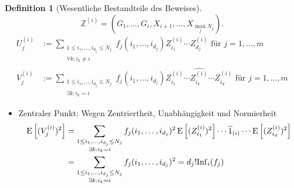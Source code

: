 \documentclass[11pt, ngerman]{scrartcl}
\theoremstyle{definition}
\newtheorem{definition}{Definition}
\theoremstyle{plain}
\newcommand{\E}[1][]{%
    \operatorname{E}%
    \ifx\\#1\\\else%
        \left[#1\right]%
    \fi%
}
\newcommand{\<}{\langle}
\renewcommand{\>}{\rangle}
\begin{document}
\begin{definition}[Wesentliche Bestandteile des Beweises]
  \[
        \mathbb{Z}^{(i)} = \left(G_1, \ldots, G_i, X_{i+1}, \ldots, X_{\max_j N_j}\right).\]
  \begin{align*}
        U_j^{(i)} &:= \sum_{\substack{1 \leq i_1, \ldots, i_{d_j} \leq N_j \\ \forall k: i_k \neq i}} f_j(i_1, \ldots, i_{d_j}) Z_{i_1}^{(i)} \cdots Z_{d_j}^{(i)} \text{ für } j = 1, \ldots, m\\
        V_j^{(i)} &:= \sum_{\substack{1 \leq i_1, \ldots, i_{d_j} \leq N_j \\ \exists k: i_k = i}} f_j(i_1, \ldots, i_{d_j}) Z_{i_1}^{(i)} \cdots \widehat{Z_{i_{k}}^{(i)}} \cdots Z_{i_d}^{(i)} \text{ für } j = 1, \ldots, m
    \end{align*}
\end{definition}
\begin{itemize}
  \item Zentraler Punkt: Wegen Zentriertheit, Unabhängigkeit und Normierheit \begin{align*}\E[(V_j^{(i)})^2] &= \sum_{\substack{1 \leq i_1, \ldots, i_{d_j} \leq N_j \\ \exists k: i_k = i}} f_j(i_1, \ldots, i_{d_j})^2 \E[(Z_{i_1}^{(i)})^2] \cdots \widehat{1}_{(i)} \cdots \E[(Z_{i_d}^{(i)})^2] \\ &= \sum_{\substack{1 \leq i_1, \ldots, i_{d_j} \leq N_j \\ \exists k: i_k = i}} f_j(i_1, \ldots, i_{d_j})^2 = d_j! \mathrm{Inf}_i(f_j) \end{align*} 
\end{itemize}
\end{document}
